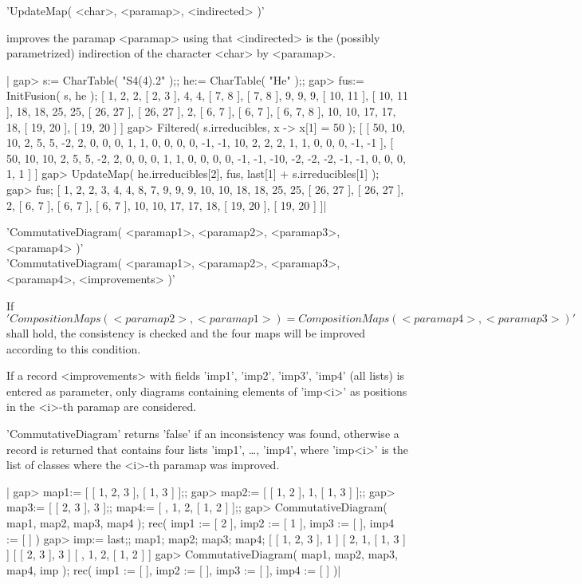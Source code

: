'UpdateMap( <char>, <paramap>, <indirected> )'

improves the paramap <paramap> using that <indirected> is the (possibly
parametrized) indirection of the character <char> by <paramap>.

|    gap> s:= CharTable( "S4(4).2" );; he:= CharTable( "He" );;
    gap> fus:= InitFusion( s, he );
    [ 1, 2, 2, [ 2, 3 ], 4, 4, [ 7, 8 ], [ 7, 8 ], 9, 9, 9, [ 10, 11 ], 
      [ 10, 11 ], 18, 18, 25, 25, [ 26, 27 ], [ 26, 27 ], 2, [ 6, 7 ],
      [ 6, 7 ], [ 6, 7, 8 ], 10, 10, 17, 17, 18, [ 19, 20 ], [ 19, 20 ] ]
    gap> Filtered( s.irreducibles, x -> x[1] = 50 );
    [ [ 50, 10, 10, 2, 5, 5, -2, 2, 0, 0, 0, 1, 1, 0, 0, 0, 0, -1, -1,
          10, 2, 2, 2, 1, 1, 0, 0, 0, -1, -1 ], 
      [ 50, 10, 10, 2, 5, 5, -2, 2, 0, 0, 0, 1, 1, 0, 0, 0, 0, -1, -1,
          -10, -2, -2, -2, -1, -1, 0, 0, 0, 1, 1 ] ]
    gap> UpdateMap( he.irreducibles[2], fus, last[1] + s.irreducibles[1] );
    gap> fus;
    [ 1, 2, 2, 3, 4, 4, 8, 7, 9, 9, 9, 10, 10, 18, 18, 25, 25, 
      [ 26, 27 ], [ 26, 27 ], 2, [ 6, 7 ], [ 6, 7 ], [ 6, 7 ], 10, 10, 
      17, 17, 18, [ 19, 20 ], [ 19, 20 ] ]|


'CommutativeDiagram( <paramap1>, <paramap2>, <paramap3>, <paramap4> )'\\
'CommutativeDiagram( <paramap1>, <paramap2>, <paramap3>, <paramap4>,
                     <improvements> )'

If \[ 'CompositionMaps(<paramap2>,<paramap1> ) =
    CompositionMaps(<paramap4>,<paramap3> )' \]
shall hold, the consistency is checked and the four maps
will be improved according to this condition.

If a record <improvements> with fields 'imp1', 'imp2', 'imp3', 'imp4' 
(all lists) is entered as parameter, only diagrams containing elements of
'imp<i>' as positions in the <i>-th paramap are considered.

'CommutativeDiagram' returns 'false' if an inconsistency was found,
otherwise a record is returned that contains four lists 'imp1', \ldots,
'imp4', where 'imp<i>' is the list of classes where the <i>-th paramap was
improved.

|    gap> map1:= [ [ 1, 2, 3 ], [ 1, 3 ] ];;
    gap> map2:= [ [ 1, 2 ], 1, [ 1, 3 ] ];;
    gap> map3:= [ [ 2, 3 ], 3 ];; map4:= [ , 1, 2, [ 1, 2 ] ];;
    gap> CommutativeDiagram( map1, map2, map3, map4 );
    rec(
      imp1 := [ 2 ],
      imp2 := [ 1 ],
      imp3 := [  ],
      imp4 := [  ] )
    gap> imp:= last;; map1; map2; map3; map4;
    [ [ 1, 2, 3 ], 1 ]
    [ 2, 1, [ 1, 3 ] ]
    [ [ 2, 3 ], 3 ]
    [ , 1, 2, [ 1, 2 ] ]
    gap> CommutativeDiagram( map1, map2, map3, map4, imp );
    rec(
      imp1 := [  ],
      imp2 := [  ],
      imp3 := [  ],
      imp4 := [  ] )|

